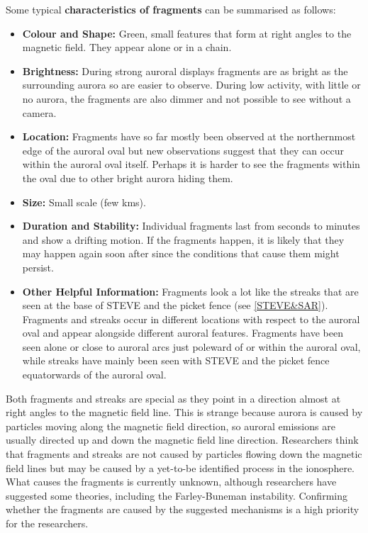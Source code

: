 \documentclass{article}
\begin{document}
Some typical {\bf characteristics of fragments} can be summarised as follows:
\begin{itemize}
    \item \textbf{Colour and Shape:} Green, small features that form at right angles to the magnetic field. They appear alone or in a chain. 
    \item \textbf{Brightness:} During strong auroral displays fragments are as bright as the surrounding aurora so are easier to observe. During low activity, with little or no aurora, the fragments are also dimmer and not possible to see without a camera.
    \item \textbf{Location:} Fragments have so far mostly been observed at the northernmost edge of the auroral oval but new observations suggest that they can occur within the auroral oval itself. Perhaps it is harder to see the fragments within the oval due to other bright aurora hiding them. 
    \item \textbf{Size:} Small scale (few kms).
    \item \textbf{Duration and Stability:} Individual fragments last from seconds to minutes and show a drifting motion. If the fragments happen, it is likely that they may happen again soon after since the conditions that cause them might persist. 
    \item \textbf{Other Helpful Information:} Fragments look a lot like the streaks that are seen at the base of STEVE and the picket fence (see \ref{STEVE&SAR}). Fragments and streaks occur in different locations with respect to the auroral oval and appear alongside different auroral features. Fragments have been seen alone or close to auroral arcs just poleward of or within the auroral oval, while streaks have mainly been seen with STEVE and the picket fence equatorwards of the auroral oval. 
    \end{itemize}
 
Both fragments and streaks are special as they point in a direction almost at right angles to the magnetic field line. This is strange because aurora is caused by particles moving along the magnetic field direction, so auroral emissions are usually directed up and down the magnetic field line direction. Researchers think that fragments and streaks are not caused by particles flowing down the magnetic field lines but may be caused by a yet-to-be identified process in the ionosphere. What causes the fragments is currently unknown, although researchers have suggested some theories, including the Farley-Buneman instability. Confirming whether the fragments are caused by the suggested mechanisms is a high priority for the researchers. 
\end{document}
